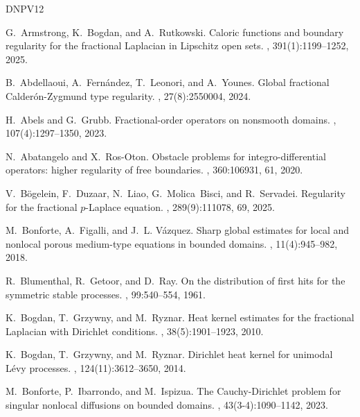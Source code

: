 \documentclass[11pt,reqno]{amsart}
\theoremstyle{plain}
\theoremstyle{definition}
\numberwithin{equation}{section}
\newcommand{\1}{\mathbbm{1}}
\begin{document}
\newcommand{\etalchar}[1]{$^{#1}$}
\begin{thebibliography}{DNPV12}

G.~Armstrong, K.~Bogdan, and A.~Rutkowski.
\newblock Caloric functions and boundary regularity for the fractional
  {L}aplacian in {L}ipschitz open sets.
, 391(1):1199--1252, 2025.

B.~Abdellaoui, A.~Fern{\'a}ndez, T.~Leonori, and A.~Younes.
\newblock Global fractional {C}alder{\'o}n-{Z}ygmund type regularity.
, 27(8):2550004, 2024.

H.~Abels and G.~Grubb.
\newblock Fractional-order operators on nonsmooth domains.
, 107(4):1297--1350, 2023.

N.~Abatangelo and X.~Ros-Oton.
\newblock Obstacle problems for integro-differential operators: higher
  regularity of free boundaries.
, 360:106931, 61, 2020.

\bibitem[BDL{\etalchar{+}}25]{BDLMS25}
V.~B\"ogelein, F.~Duzaar, N.~Liao, G.~Molica~Bisci, and R.~Servadei.
\newblock Regularity for the fractional $p$-{L}aplace equation.
, 289(9):111078, 69, 2025.

M.~Bonforte, A.~Figalli, and J.~L. V\'azquez.
\newblock Sharp global estimates for local and nonlocal porous medium-type
  equations in bounded domains.
, 11(4):945--982, 2018.

R.~Blumenthal, R.~Getoor, and D.~Ray.
\newblock On the distribution of first hits for the symmetric stable processes.
, 99:540--554, 1961.

K.~Bogdan, T.~Grzywny, and M.~Ryznar.
\newblock Heat kernel estimates for the fractional {L}aplacian with {D}irichlet
  conditions.
, 38(5):1901--1923, 2010.

K.~Bogdan, T.~Grzywny, and M.~Ryznar.
\newblock Dirichlet heat kernel for unimodal {L}\'evy processes.
, 124(11):3612--3650, 2014.

M.~Bonforte, P.~Ibarrondo, and M.~Ispizua.
\newblock The {C}auchy-{D}irichlet problem for singular nonlocal diffusions on
  bounded domains.
, 43(3-4):1090--1142, 2023.


\end{thebibliography}
\end{document}
